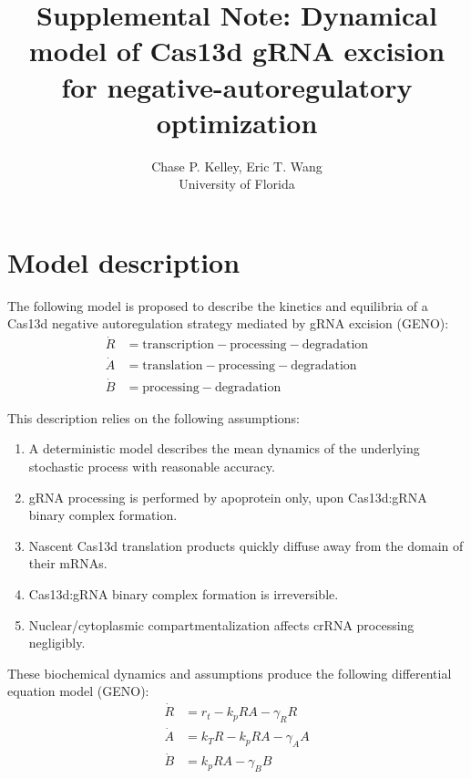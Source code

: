 \documentclass[12pt]{article}
\numberwithin{equation}{section}
\begin{document}

\title{Supplemental Note: Dynamical model of Cas13d gRNA excision for negative-autoregulatory optimization}
\author{Chase P. Kelley, Eric T. Wang\\
University of Florida}

\maketitle

\section{Model description}

\noindent The following model is proposed to describe the kinetics and equilibria of a Cas13d negative autoregulation strategy mediated by gRNA excision (GENO):
\begin{align*}
  \dot{R} &= \text{transcription} - \text{processing} - \text{degradation}\\
  \dot{A} &= \text{translation} - \text{processing} - \text{degradation}\\
  \dot{B} &= \text{processing} - \text{degradation}
\end{align*}

\noindent This description relies on the following assumptions:
\begin{enumerate}
  \item A deterministic model describes the mean dynamics of the underlying stochastic process with reasonable accuracy.
  \item gRNA processing is performed by apoprotein only, upon Cas13d:gRNA binary complex formation.
  \item Nascent Cas13d translation products quickly diffuse away from the domain of their mRNAs.
  \item Cas13d:gRNA binary complex formation is irreversible.
  \item Nuclear/cytoplasmic compartmentalization affects crRNA processing negligibly.
\end{enumerate}

\noindent These biochemical dynamics and assumptions produce the following differential equation model (GENO):
\begin{align}
  \dot{R} &= r_t - k_p R A - \gamma_R R\\
  \dot{A} &= k_T R - k_p R A - \gamma_A A\\
  \dot{B} &= k_p R A - \gamma_B B
\end{align}
\end{document}

